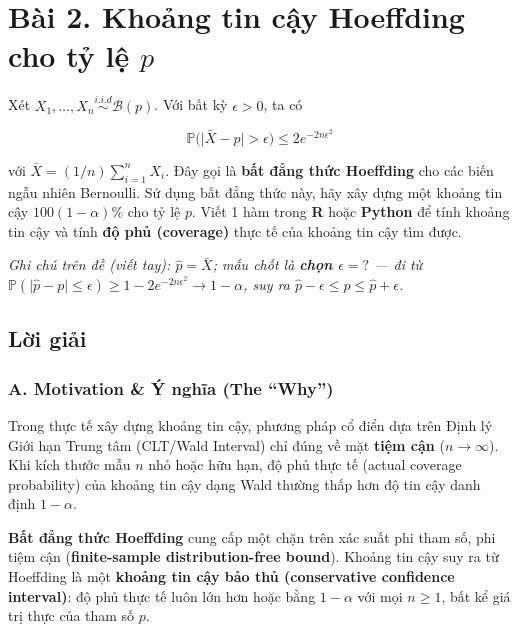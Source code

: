 \documentclass[12pt,a4paper]{article}
\begin{document}
\section{\texorpdfstring{Bài 2. Khoảng tin cậy Hoeffding cho tỷ lệ \(p\)}{Bài 2. Khoảng tin cậy Hoeffding cho tỷ lệ p}}\label{buxe0i-2.-khoux1ea3ng-tin-cux1eady-hoeffding-cho-tux1ef7-lux1ec7-p}

\begin{debai}

Xét \(X_1, \dots, X_n \overset{i.i.d}{\sim} \mathcal{B}(p)\). Với bất kỳ \(\epsilon > 0\), ta có

\[\mathbb{P}\big(\vert{}\bar{X} - p\vert{} > \epsilon\big) \le 2 e^{-2n\epsilon^2}\]

với \(\bar{X} = (1/n)\sum_{i=1}^n X_i\). Đây gọi là \textbf{bất đẳng thức Hoeffding} cho các biến ngẫu nhiên Bernoulli. Sử dụng bất đẳng thức này, hãy xây dựng một khoảng tin cậy \(100(1-\alpha)\%\) cho tỷ lệ \(p\). Viết 1 hàm trong \textbf{R} hoặc \textbf{Python} để tính khoảng tin cậy và tính \textbf{độ phủ (coverage)} thực tế của khoảng tin cậy tìm được.

\emph{Ghi chú trên đề (viết tay): \(\widehat{p} = \bar{X}\); mấu chốt là \textbf{chọn \(\epsilon = ?\)} --- đi từ \(\mathbb{P}(\vert{}\widehat{p}-p\vert{} \le \epsilon) \ge 1 - 2e^{-2n\epsilon^2} \to 1-\alpha\), suy ra \(\widehat{p} - \epsilon \le p \le \widehat{p} + \epsilon\).}

\end{debai}
\subsection*{Lời giải}

\subsubsection{A. Motivation \& Ý nghĩa (The ``Why'')}\label{a.-motivation-uxfd-nghux129a-the-why-1}

Trong thực tế xây dựng khoảng tin cậy, phương pháp cổ điển dựa trên Định lý Giới hạn Trung tâm (CLT/Wald Interval) chỉ đúng về mặt \textbf{tiệm cận} (\(n \to \infty\)). Khi kích thước mẫu \(n\) nhỏ hoặc hữu hạn, độ phủ thực tế (actual coverage probability) của khoảng tin cậy dạng Wald thường thấp hơn độ tin cậy danh định \(1 - \alpha\).

\textbf{Bất đẳng thức Hoeffding} cung cấp một chặn trên xác suất phi tham số, phi tiệm cận (\textbf{finite-sample distribution-free bound}). Khoảng tin cậy suy ra từ Hoeffding là một \textbf{khoảng tin cậy bảo thủ (conservative confidence interval)}: độ phủ thực tế luôn lớn hơn hoặc bằng \(1 - \alpha\) với mọi \(n \ge 1\), bất kể giá trị thực của tham số \(p\).
\end{document}

